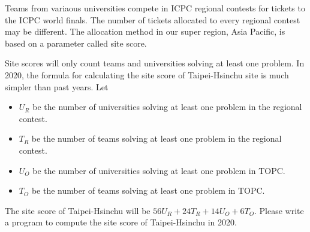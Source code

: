 Teams from variaous universities compete in ICPC regional contests for tickets 
to the ICPC world finals. The number of tickets allocated to every regional
contest may be different. The allocation method in our super region,
Asia Pacific, is based on a parameter called site score.

Site scores will only count teams and universities solving at least one problem.
In 2020, the formula for calculating the site score of Taipei-Hsinchu site
is much simpler than past years. Let
\begin{itemize}
\tightlist
\item $U_R$ be the number of universities solving at least one problem in 
the regional contest.
\item $T_R$ be the number of teams solving at least one problem in the regional
contest.
\item $U_O$ be the number of universities solving at least one problem in
TOPC. 
\item $T_O$ be the number of teams solving at least one problem in TOPC. 
\end{itemize}
The site score of Taipei-Hsinchu will be $56U_R+24T_R+14U_O+6T_O$. 
Please write a program to compute the site score of Taipei-Hsinchu in 2020.
